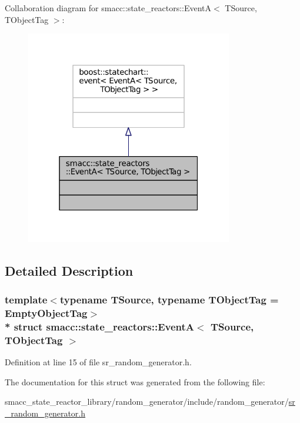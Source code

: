 Collaboration diagram for smacc\+:\+:state\+\_\+reactors\+:\+:EventA$<$ T\+Source, T\+Object\+Tag $>$\+:
\nopagebreak
\begin{figure}[H]
\begin{center}
\leavevmode
\includegraphics[width=256pt]{structsmacc_1_1state__reactors_1_1EventA__coll__graph}
\end{center}
\end{figure}


\subsection{Detailed Description}
\subsubsection*{template$<$typename T\+Source, typename T\+Object\+Tag = Empty\+Object\+Tag$>$\\*
struct smacc\+::state\+\_\+reactors\+::\+Event\+A$<$ T\+Source, T\+Object\+Tag $>$}



Definition at line 15 of file sr\+\_\+random\+\_\+generator.\+h.



The documentation for this struct was generated from the following file\+:\begin{DoxyCompactItemize}
\item 
smacc\+\_\+state\+\_\+reactor\+\_\+library/random\+\_\+generator/include/random\+\_\+generator/\hyperlink{sr__random__generator_8h}{sr\+\_\+random\+\_\+generator.\+h}\end{DoxyCompactItemize}
